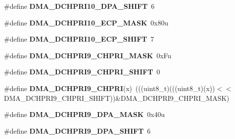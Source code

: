 \begin{DoxyCompactItemize}
\item 
\#define {\bfseries D\+M\+A\+\_\+\+D\+C\+H\+P\+R\+I10\+\_\+\+D\+P\+A\+\_\+\+S\+H\+I\+FT}~6\hypertarget{group__DMA__Register__Masks_ga81809b2ae57f16cec20cb50f1a4a8b1e}{}\label{group__DMA__Register__Masks_ga81809b2ae57f16cec20cb50f1a4a8b1e}

\item 
\#define {\bfseries D\+M\+A\+\_\+\+D\+C\+H\+P\+R\+I10\+\_\+\+E\+C\+P\+\_\+\+M\+A\+SK}~0x80u\hypertarget{group__DMA__Register__Masks_ga7a9d675356e6d5951279c4781bb5a1c7}{}\label{group__DMA__Register__Masks_ga7a9d675356e6d5951279c4781bb5a1c7}

\item 
\#define {\bfseries D\+M\+A\+\_\+\+D\+C\+H\+P\+R\+I10\+\_\+\+E\+C\+P\+\_\+\+S\+H\+I\+FT}~7\hypertarget{group__DMA__Register__Masks_ga9d6bb10c4809a0eb5120c5e7cdf6adfc}{}\label{group__DMA__Register__Masks_ga9d6bb10c4809a0eb5120c5e7cdf6adfc}

\item 
\#define {\bfseries D\+M\+A\+\_\+\+D\+C\+H\+P\+R\+I9\+\_\+\+C\+H\+P\+R\+I\+\_\+\+M\+A\+SK}~0x\+Fu\hypertarget{group__DMA__Register__Masks_gac782f5e68a3eef4653396b11311fc41b}{}\label{group__DMA__Register__Masks_gac782f5e68a3eef4653396b11311fc41b}

\item 
\#define {\bfseries D\+M\+A\+\_\+\+D\+C\+H\+P\+R\+I9\+\_\+\+C\+H\+P\+R\+I\+\_\+\+S\+H\+I\+FT}~0\hypertarget{group__DMA__Register__Masks_ga673fcc8804637150719453e55168fc66}{}\label{group__DMA__Register__Masks_ga673fcc8804637150719453e55168fc66}

\item 
\#define {\bfseries D\+M\+A\+\_\+\+D\+C\+H\+P\+R\+I9\+\_\+\+C\+H\+P\+RI}(x)~(((uint8\+\_\+t)(((uint8\+\_\+t)(x))$<$$<$D\+M\+A\+\_\+\+D\+C\+H\+P\+R\+I9\+\_\+\+C\+H\+P\+R\+I\+\_\+\+S\+H\+I\+FT))\&D\+M\+A\+\_\+\+D\+C\+H\+P\+R\+I9\+\_\+\+C\+H\+P\+R\+I\+\_\+\+M\+A\+SK)\hypertarget{group__DMA__Register__Masks_ga891fccde7e5bc5c0708b5f06996a7814}{}\label{group__DMA__Register__Masks_ga891fccde7e5bc5c0708b5f06996a7814}

\item 
\#define {\bfseries D\+M\+A\+\_\+\+D\+C\+H\+P\+R\+I9\+\_\+\+D\+P\+A\+\_\+\+M\+A\+SK}~0x40u\hypertarget{group__DMA__Register__Masks_gaf6b71f66ce2e3113012b094e339c2c97}{}\label{group__DMA__Register__Masks_gaf6b71f66ce2e3113012b094e339c2c97}

\item 
\#define {\bfseries D\+M\+A\+\_\+\+D\+C\+H\+P\+R\+I9\+\_\+\+D\+P\+A\+\_\+\+S\+H\+I\+FT}~6\hypertarget{group__DMA__Register__Masks_ga369577ef8e1c3d9eb3756e1a37abe070}{}\label{group__DMA__Register__Masks_ga369577ef8e1c3d9eb3756e1a37abe070}


\end{DoxyCompactItemize}
